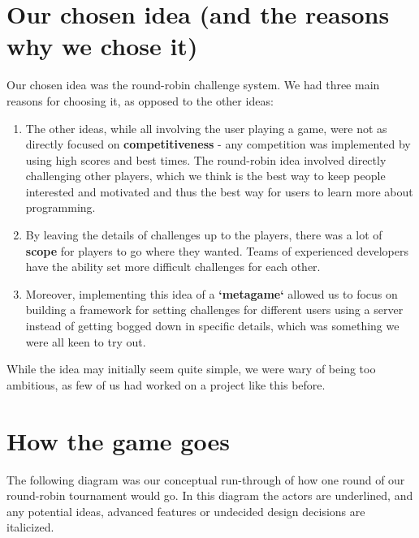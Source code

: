\documentclass{report}
\begin{document}
\section{Our chosen idea (and the reasons why we chose it)}
Our chosen idea was the round-robin challenge system. We had three main reasons for choosing it, as opposed to the other ideas:
\begin{enumerate}
\item The other ideas, while all involving the user playing a game, were not as directly focused on \textbf{competitiveness} - any competition was implemented by using high scores and best times. The round-robin idea involved directly challenging other players, which we think is the best way to keep people interested and motivated and thus the best way for users to learn more about programming.
\item By leaving the details of challenges up to the players, there was a lot of \textbf{scope} for players to go where they wanted. Teams of experienced developers have the ability set more difficult challenges for each other.
\item Moreover, implementing this idea of a \textbf{`metagame`} allowed us to focus on building a framework for setting challenges for different users using a server instead of getting bogged down in specific details, which was something we were all keen to try out.
\end{enumerate}
While the idea may initially seem quite simple, we were wary of being too ambitious, as few of us had worked on a project like this before.

\section{How the game goes}
The following diagram was our conceptual run-through of how one round of our round-robin tournament would go. In this diagram the actors are underlined, and any potential ideas, advanced features or undecided design decisions are italicized.
\end{document}

